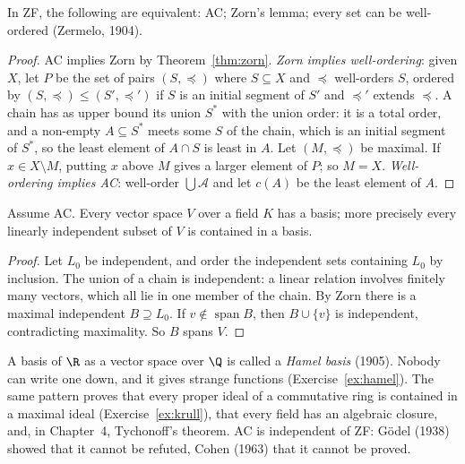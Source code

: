 \begin{theorem}\label{thm:wellordering}
In ZF, the following are equivalent: AC; Zorn's lemma; every set can be well-ordered (Zermelo, 1904).
\end{theorem}
\begin{proof}
AC implies Zorn by Theorem~\ref{thm:zorn}. \emph{Zorn implies well-ordering}: given $X$, let $P$ be the set of pairs $(S,\preceq)$ where $S\subseteq X$
and $\preceq$ well-orders $S$, ordered by $(S,\preceq)\le(S',\preceq')$ if $S$ is an initial segment of $S'$ and $\preceq'$ extends $\preceq$. A chain has as upper
bound its union $S^*$ with the union order: it is a total order, and a non-empty $A\subseteq S^*$ meets some $S$ of the chain, which is an initial
segment of $S^*$, so the least element of $A\cap S$ is least in $A$. Let $(M,\preceq)$ be maximal. If $x\in X\setminus M$, putting $x$ above $M$ gives a larger
element of $P$; so $M=X$. \emph{Well-ordering implies AC}: well-order $\bigcup\mathcal A$ and let $c(A)$ be the least element of $A$.
\end{proof}

\begin{theorem}\label{thm:basis}
Assume AC. Every vector space $V$ over a field $K$ has a basis; more precisely every linearly independent subset of $V$ is
contained in a basis.
\end{theorem}
\begin{proof}
Let $L_0$ be independent, and order the independent sets containing $L_0$ by inclusion. The union of a chain is independent:
a linear relation involves finitely many vectors, which all lie in one member of the chain. By Zorn there is a maximal
independent $B\supseteq L_0$. If $v\notin\operatorname{span}B$, then $B\cup\{v\}$ is independent, contradicting maximality. So $B$ spans $V$.
\end{proof}

A basis of $\R$ as a vector space over $\Q$ is called a \emph{Hamel basis} (1905). Nobody can write one down, and it gives
strange functions (Exercise~\ref{ex:hamel}). The same pattern proves that every proper ideal of a commutative ring is
contained in a maximal ideal (Exercise~\ref{ex:krull}), that every field has an algebraic closure, and, in Chapter~4,
Tychonoff's theorem. AC is independent of ZF: G\"odel (1938) showed that it cannot be refuted, Cohen (1963) that it cannot
be proved.

